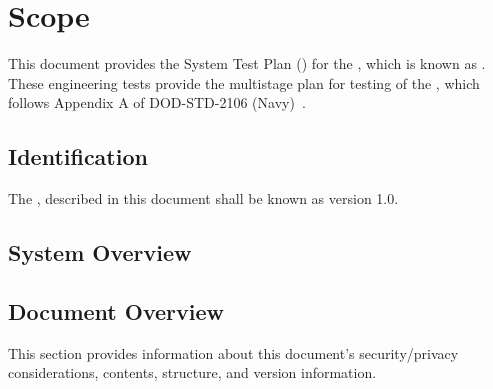 
\chapter{Scope}
\label{loc:Scope}


This document provides the System Test Plan (\STP) for the \ThisSystem, which is known as \ThisSys.
These engineering tests provide the multistage plan for testing of the \ThisSys, which follows Appendix A of DOD-STD-2106 (Navy)~\cite{ref__DOD_STD_2106_NAVY}.


\section{Identification}


The \ThisSys, described in this document shall be known as \ThisSys version 1.0.


\section{System Overview}
\label{loc:SystemOverview}





\section{Document Overview}
\label{loc:DocumentOverview}


This section provides information about this document's security/privacy considerations, contents, structure, and version information.








